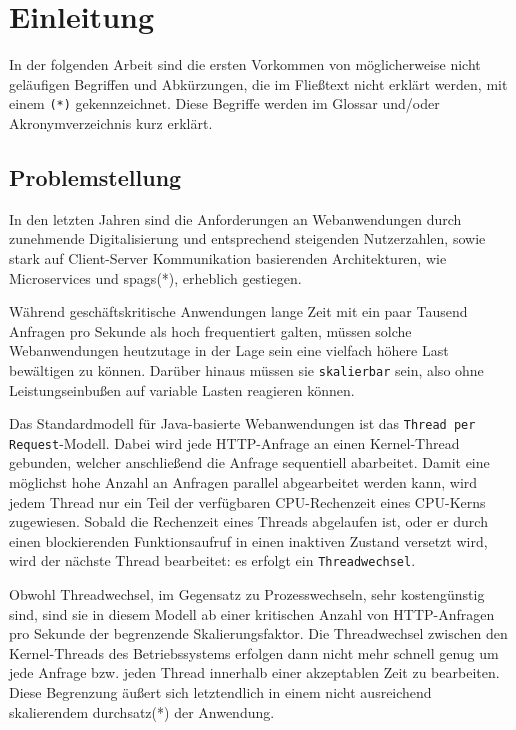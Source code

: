 \section{Einleitung}
\label{sec:einleitung}
In der folgenden Arbeit sind die ersten Vorkommen von möglicherweise nicht geläufigen Begriffen und Abkürzungen, die
im Fließtext nicht erklärt werden, mit einem \verb|(*)| gekennzeichnet.
Diese Begriffe werden im Glossar und/oder Akronymverzeichnis kurz erklärt.

\subsection{Problemstellung}
\label{subsec:problemstellung}
In den letzten Jahren sind die Anforderungen an Webanwendungen durch zunehmende Digitalisierung und entsprechend steigenden Nutzerzahlen,
sowie stark auf Client-Server Kommunikation basierenden Architekturen, wie Microservices und \Glspl{spag}(*), erheblich gestiegen.

Während geschäftskritische Anwendungen lange Zeit mit ein paar Tausend Anfragen pro Sekunde als hoch frequentiert
galten, müssen solche Webanwendungen heutzutage in der Lage sein eine vielfach höhere Last bewältigen zu können.
Darüber hinaus müssen sie \verb|skalierbar| sein, also ohne Leistungseinbußen auf variable Lasten reagieren können.

Das Standardmodell für Java-basierte Webanwendungen ist das \verb|Thread per Request|-Modell.
Dabei wird jede HTTP-Anfrage an einen Kernel-Thread gebunden, welcher anschließend die Anfrage sequentiell abarbeitet.
Damit eine möglichst hohe Anzahl an Anfragen parallel abgearbeitet werden kann, wird jedem Thread nur ein Teil der verfügbaren
CPU-Rechenzeit eines CPU-Kerns zugewiesen. Sobald die Rechenzeit eines Threads abgelaufen ist, oder er durch einen blockierenden
Funktionsaufruf in einen inaktiven Zustand versetzt wird, wird der nächste Thread bearbeitet: es erfolgt ein \verb|Threadwechsel|.

Obwohl Threadwechsel, im Gegensatz zu Prozesswechseln, sehr kostengünstig sind, sind sie in diesem Modell ab einer kritischen Anzahl von HTTP-Anfragen
pro Sekunde der begrenzende Skalierungsfaktor. Die Threadwechsel zwischen den Kernel-Threads des Betriebssystems erfolgen dann nicht mehr
schnell genug um jede Anfrage bzw. jeden Thread innerhalb einer akzeptablen Zeit zu bearbeiten.
Diese Begrenzung äußert sich letztendlich in einem nicht ausreichend skalierendem \Gls{durchsatz}(*) der Anwendung.


